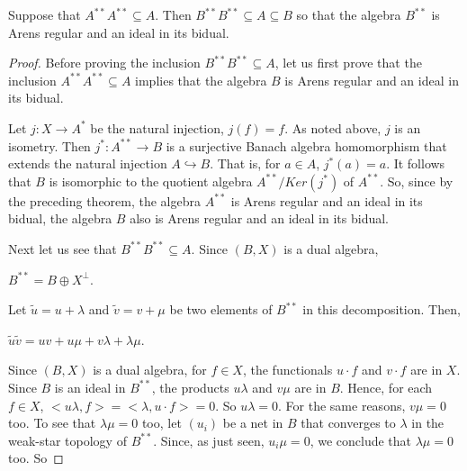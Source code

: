 \documentclass[10pt,a4paper]{amsart}
\begin{document}
\begin{theorem} Suppose that $ A^{**}A^{**}\subseteq A $. Then $ B^{**}B^{**}\subseteq A\subseteq B $ so that the algebra $ B^{**} $ is Arens regular and an ideal in its bidual.	
\end{theorem} 

\begin{proof}
	Before proving the inclusion $ B^{**}B^{**}\subseteq A $, let us first prove that the inclusion $ A^{**}A^{**}\subseteq A $ implies that the algebra $ B $ is Arens regular and an ideal in its bidual.\vspace{2mm}
	
	\noindent Let $ j:X\rightarrow A^{*} $ be the natural injection, $ j(f)=f $. As noted above, $ j $ is an isometry. Then $ j^{*}:A^{**}\rightarrow B $ is a surjective Banach algebra homomorphism that extends the natural injection $ A\hookrightarrow B $. That is, for $ a\in A $,  $ j^{*}(a)=a $. It follows that $ B $ is isomorphic to the quotient algebra $ A^{**}/Ker(j^{*}) $ of $ A^{**} $. So, since by the preceding theorem, the algebra $ A^{**} $ is Arens regular and an ideal in its bidual,  the algebra $ B $ also is Arens regular and an ideal in its bidual.\vspace{2mm}
	
	Next let us see that $ B^{**}B^{**}\subseteq A $. Since $ (B,X) $ is a dual algebra,\vspace{2mm}
	
	 $ B^{**}=B\oplus X^{\perp} $.\vspace{2mm}
	 
	 \noindent Let $ \tilde{u}=u+\lambda $ and $ \tilde{v}=v+\mu $ be two elements of $ B^{**} $ in this decomposition. Then, \vspace{3mm}
	
	$ \tilde{ u}\tilde{v}=uv+u\mu+v\lambda+\lambda \mu $.\vspace{3mm}
	
	\noindent Since $ (B,X) $ is a dual algebra,  for $ f\in X $, the functionals  $ u\cdot f$  and $v\cdot f$ are in $ X $. Since $ B $ is an ideal in $ B^{**} $, the products $ u\lambda $ and $ v\mu $ are in $ B $. Hence, for each $ f\in X $, $ <u\lambda,f>=<\lambda,u\cdot f>=0 $. So $ u\lambda=0$. For the same reasons, $v\mu=0 $ too. To see that $ \lambda\mu=0 $ too, let $ (u_{i}) $ be a net in $ B $ that converges to $ \lambda $ in the weak-star topology of $ B^{**} $. Since, as just seen, $ u_{i}\mu=0 $, we conclude that $ \lambda\mu=0 $ too. So\vspace{2mm}
	

\end{proof}
\end{document}
